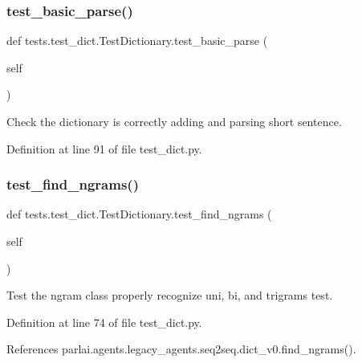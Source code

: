 \subsubsection{\texorpdfstring{test\+\_\+basic\+\_\+parse()}{test\_basic\_parse()}}
{\footnotesize\ttfamily def tests.\+test\+\_\+dict.\+Test\+Dictionary.\+test\+\_\+basic\+\_\+parse (\begin{DoxyParamCaption}\item[{}]{self }\end{DoxyParamCaption})}

\begin{DoxyVerb}Check the dictionary is correctly adding and parsing short sentence.\end{DoxyVerb}
 

Definition at line 91 of file test\+\_\+dict.\+py.

\mbox{\label{classtests_1_1test__dict_1_1TestDictionary_ae017e72c578005310906979e15c51fe4}} 
\subsubsection{\texorpdfstring{test\+\_\+find\+\_\+ngrams()}{test\_find\_ngrams()}}
{\footnotesize\ttfamily def tests.\+test\+\_\+dict.\+Test\+Dictionary.\+test\+\_\+find\+\_\+ngrams (\begin{DoxyParamCaption}\item[{}]{self }\end{DoxyParamCaption})}

\begin{DoxyVerb}Test the ngram class properly recognize uni, bi, and trigrams test.\end{DoxyVerb}
 

Definition at line 74 of file test\+\_\+dict.\+py.



References parlai.\+agents.\+legacy\+\_\+agents.\+seq2seq.\+dict\+\_\+v0.\+find\+\_\+ngrams().


